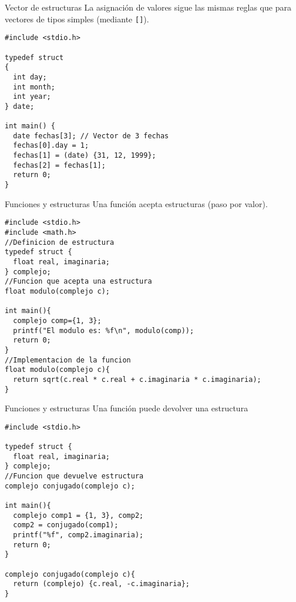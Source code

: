 \documentclass[xcolor={usenames,svgnames,dvipsnames}, aspectratio=169]{beamer}
\begin{document}
\begin{frame}[label={sec:org0992064},fragile,plain]{Vector de estructuras}
 La asignación de valores sigue las mismas reglas que para vectores de tipos simples (mediante \texttt{[]}).
\lstset{language=C,label= ,caption= ,captionpos=b,numbers=none}
\begin{lstlisting}
#include <stdio.h>

typedef struct
{
  int day;
  int month;
  int year;
} date;

int main() {
  date fechas[3]; // Vector de 3 fechas
  fechas[0].day = 1;
  fechas[1] = (date) {31, 12, 1999};
  fechas[2] = fechas[1];
  return 0;
}
\end{lstlisting}
\end{frame}

\begin{frame}[label={sec:org09641a8},fragile,plain]{Funciones y estructuras}
 Una función acepta estructuras (\alert{paso por valor}).

\lstset{language=C,label= ,caption= ,captionpos=b,numbers=none}
\begin{lstlisting}
#include <stdio.h>
#include <math.h>
//Definicion de estructura
typedef struct {
  float real, imaginaria;
} complejo;
//Funcion que acepta una estructura
float modulo(complejo c);

int main(){
  complejo comp={1, 3};
  printf("El modulo es: %f\n", modulo(comp));
  return 0;
}
//Implementacion de la funcion
float modulo(complejo c){
  return sqrt(c.real * c.real + c.imaginaria * c.imaginaria);
}
\end{lstlisting}
\end{frame}

\begin{frame}[label={sec:org5a32c17},fragile,plain]{Funciones y estructuras}
 Una función puede devolver una estructura

\lstset{language=C,label= ,caption= ,captionpos=b,numbers=none}
\begin{lstlisting}
#include <stdio.h>

typedef struct {
  float real, imaginaria;
} complejo;
//Funcion que devuelve estructura
complejo conjugado(complejo c);

int main(){
  complejo comp1 = {1, 3}, comp2;
  comp2 = conjugado(comp1);
  printf("%f", comp2.imaginaria);
  return 0;
}

complejo conjugado(complejo c){
  return (complejo) {c.real, -c.imaginaria}; 
}
\end{lstlisting}
\end{frame}
\end{document}

